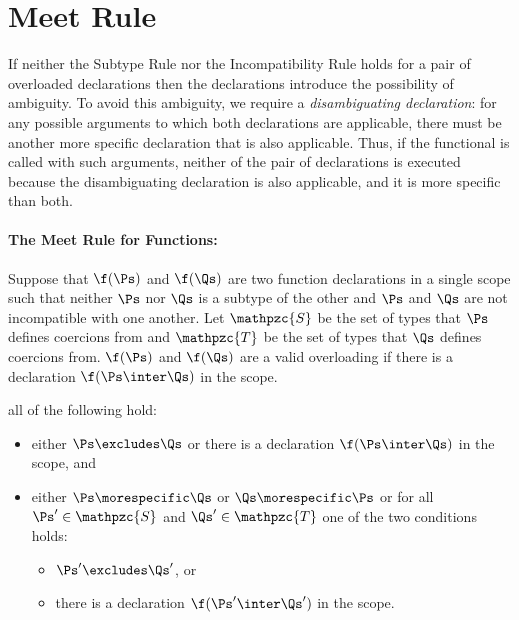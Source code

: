 \section{Meet Rule}

If neither the Subtype Rule nor the Incompatibility Rule holds 
for a pair of overloaded declarations 
then the declarations introduce the possibility of ambiguity.  
To avoid this ambiguity, 
we require a \emph{disambiguating declaration}:
for any possible arguments to which both declarations are applicable, 
there must be another more specific declaration that is also applicable.  
Thus, 
if the functional is called with such arguments, 
neither of the pair of declarations is executed 
because the disambiguating declaration is also applicable, 
and it is more specific than both.


\paragraph{The Meet Rule for Functions:}
Suppose that $\f(\Ps)$ and $\f(\Qs)$ are two function
declarations in a single scope
such that neither $\Ps$ nor $\Qs$ is a subtype of the other and $\Ps$ and
$\Qs$ are not incompatible with one another.
Let $\mathpzc{S}$ be the set of types that $\Ps$ defines coercions from
and $\mathpzc{T}$ be the set of types that $\Qs$ defines coercions from.
$\f(\Ps)$ and $\f(\Qs)$ are a valid overloading if
there is a declaration $\f(\Ps \inter \Qs)$ in the scope.

all of the following hold:
\begin{itemize}
\item
either $\Ps \excludes \Qs$ or there is a declaration $\f(\Ps \inter
\Qs)$ in the scope,
and
\item
either $\Ps \morespecific \Qs$ or $\Qs \morespecific \Ps$ or for all
$\Ps' \in \mathpzc{S}$ and $\Qs' \in \mathpzc{T}$ one of the two
conditions holds:
\begin{itemize}
\item
$\Ps' \excludes \Qs'$, or
\item
there is a declaration $\f(\Ps' \inter \Qs')$ in the scope.
\end{itemize}
\end{itemize}

